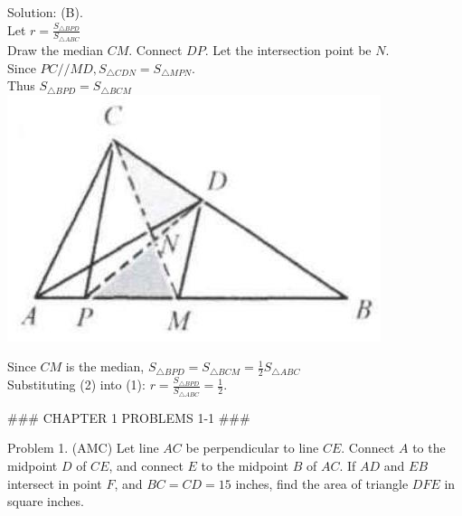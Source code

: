 \documentclass[10pt]{article}
\begin{document}
Solution: (B).\\
Let \(r=\frac{S_{\triangle B P D}}{S_{\triangle A B C}}\)\\
Draw the median \(C M\). Connect \(D P\). Let the intersection point be \(N\).\\
Since \(P C / / M D, S_{\triangle C D N}=S_{\triangle M P N}\).\\
Thus \(S_{\triangle B P D}=S_{\triangle B C M}\)\\
\includegraphics[max width=\textwidth, center]{2025_04_17_97bc1f7e44d93c271a88g-014}

Since \(C M\) is the median, \(S_{\triangle B P D}=S_{\triangle B C M}=\frac{1}{2} S_{\triangle A B C}\)\\
Substituting (2) into (1): \(r=\frac{S_{\triangle B P D}}{S_{\triangle A B C}}=\frac{1}{2}\).


### CHAPTER 1 PROBLEMS 1-1 ###

Problem 1. (AMC) Let line \(A C\) be perpendicular to line \(C E\). Connect \(A\) to the midpoint \(D\) of \(C E\), and connect \(E\) to the midpoint \(B\) of \(A C\). If \(A D\) and \(E B\) intersect in point \(F\), and \(B C=C D=15\) inches, find the area of triangle \(D F E\) in square inches.
\end{document}
